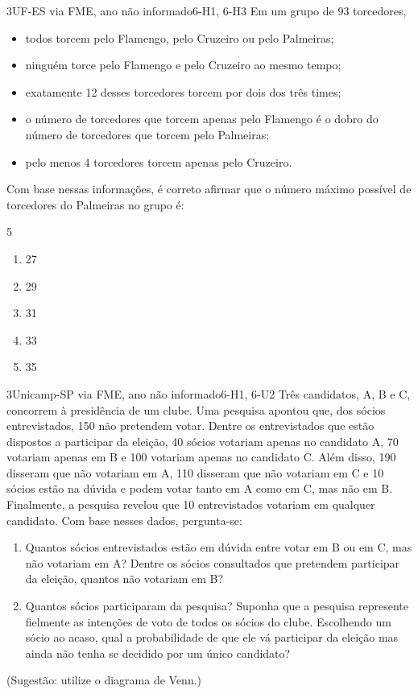 \begin{questao}{3}{UF-ES via FME, ano não informado}{6-H1, 6-H3}\label{u6:ufes30}
Em um grupo de 93 torcedores,
\begin{itemize}[leftmargin=1.4em,itemsep=0pt]
  \item todos torcem pelo Flamengo, pelo Cruzeiro ou pelo Palmeiras;
  \item ninguém torce pelo Flamengo e pelo Cruzeiro ao mesmo tempo;
  \item exatamente 12 desses torcedores torcem por dois dos três times;
  \item o número de torcedores que torcem apenas pelo Flamengo é o dobro do número de torcedores que torcem pelo Palmeiras;
  \item pelo menos 4 torcedores torcem apenas pelo Cruzeiro.
\end{itemize}
Com base nessas informações, é correto afirmar que o número máximo possível de torcedores do Palmeiras no grupo é:
\begin{multicols}{5}
\begin{enumerate}[label=\alph*)]
  \item 27
  \item 29
  \item 31
  \item 33
  \item 35
\end{enumerate}
\end{multicols}
\end{questao}

\begin{questao}[integradora]{3}{Unicamp-SP via FME, ano não informado}{6-H1, 6-U2}\label{u6:unicamp35}
Três candidatos, A, B e C, concorrem à presidência de um clube. Uma pesquisa apontou que, dos sócios entrevistados, 150 não pretendem votar. Dentre os entrevistados que estão dispostos a participar da eleição, 40 sócios votariam apenas no candidato A, 70 votariam apenas em B e 100 votariam apenas no candidato C. Além disso, 190 disseram que não votariam em A, 110 disseram que não votariam em C e 10 sócios estão na dúvida e podem votar tanto em A como em C, mas não em B. Finalmente, a pesquisa revelou que 10 entrevistados votariam em qualquer candidato. Com base nesses dados, pergunta-se:
\begin{enumerate}[label=\alph*)]
  \item Quantos sócios entrevistados estão em dúvida entre votar em B ou em C, mas não votariam em A? Dentre os sócios consultados que pretendem participar da eleição, quantos não votariam em B?
  \item Quantos sócios participaram da pesquisa? Suponha que a pesquisa represente fielmente as intenções de voto de todos os sócios do clube. Escolhendo um sócio ao acaso, qual a probabilidade de que ele vá participar da eleição mas ainda não tenha se decidido por um único candidato?
\end{enumerate}
(Sugestão: utilize o diagrama de Venn.)
\end{questao}


